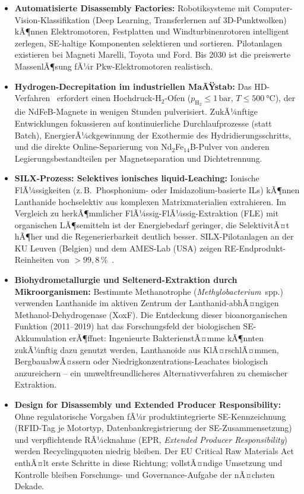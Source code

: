 ﻿\documentclass[12pt, a4paper]{report}
\theoremstyle{definition}
\theoremstyle{remark}
\begin{document}
\begin{itemize}
  \item \textbf{Automatisierte Disassembly Factories:}
    Robotiksysteme mit Computer-Vision-Klas\-sifikation (Deep Learning,
    Transferlernen auf 3D-Punktwolken) kÃ¶nnen Elektromotoren, Festplatten
    und Windturbinenrotoren intelligent zerlegen, SE-haltige Komponenten
    selektieren und sortieren. Pilotanlagen existieren bei
    Magneti Marelli, Toyota und Ford. Bis 2030 ist die preiswerte MassenlÃ¶sung
    fÃ¼r Pkw-Elektromotoren realistisch.

  \item \textbf{Hydrogen-Decrepitation im industriellen MaÃŸstab:}
    Das HD-Verfahren~\cite{zakotnik2009} erfordert einen Hochdruck-$\text{H}_2$-Ofen
    ($p_{\mathrm{H_2}} \leq 1\,\text{bar}$, $T \leq \SI{500}{\celsius}$), der die
    NdFeB-Magnete in wenigen Stunden pulverisiert. ZukÃ¼nftige Entwicklungen
    fokussieren auf kontinuierliche Durchlaufprozesse (statt Batch),
    EnergierÃ¼ckgewinnung der Exothermie des Hydridierungsschritts, und
    die direkte Online-Separierung von Nd$_2$Fe$_{14}$B-Pulver von anderen
    Legierungsbestandteilen per Magnetseparation und Dichtetrennung.

  \item \textbf{SILX-Prozess: Selektives ionisches liquid-Leaching:}
    Ionische FlÃ¼ssigkeiten (z.\,B.\ Phosphonium- oder Imidazolium-basierte
    ILs) kÃ¶nnen Lan\-thanide hochselektiv aus komplexen Matrixmaterialien
    extrahieren. Im Vergleich zu herkÃ¶mmlicher FlÃ¼ssig-FlÃ¼ssig-Extraktion
    (FLE) mit organischen LÃ¶semitteln ist der Energiebedarf geringer, die
    SelektivitÃ¤t hÃ¶her und die Regenerierbarkeit deutlich besser.
    SILX-Pilotanlagen an der KU Leuven (Belgien) und dem AMES-Lab (USA)
    zeigen RE-Endprodukt-Reinheiten von $>99{,}8\,\%$~\cite{binnemans2013}.

  \item \textbf{Biohydrometallurgie und Seltenerd-Extraktion durch Mikroorganismen:}
    Bestimmte Methanotrophe (\emph{Methylobacterium}~spp.) verwenden
    Lanthanide im aktiven Zentrum der Lanthanid-abhÃ¤ngigen
    Methanol-Dehydrogenase (XoxF). Die Entdeckung dieser bioanorganischen
    Funktion (2011--2019) hat das Forschungsfeld der biologischen
    SE-Akkumulation erÃ¶ffnet: Ingenieurte BakterienstÃ¤mme kÃ¶nnten zukÃ¼nftig
    dazu genutzt werden, Lanthanoide aus KlÃ¤rschlÃ¤mmen, BergbauabwÃ¤ssern
    oder Niedrigkonzentrations-Leachates biologisch anzureichern --
    ein umweltfreundlicheres Alternativverfahren zu chemischer Extraktion.

  \item \textbf{Design for Disassembly und Extended Producer Responsibility:}
    Ohne regulatorische Vorgaben fÃ¼r produktintegrierte SE-Kennzeichnung
    (RFID-Tag je Motortyp, Datenbankregistrierung der SE-Zusammensetzung)
    und verpflichtende RÃ¼cknahme (EPR, \emph{Extended Producer Responsibility})
    werden Recyclingquoten niedrig bleiben. Der EU Critical Raw Materials
    Act~\cite{eu2023} enthÃ¤lt erste Schritte in diese Richtung; vollstÃ¤ndige
    Umsetzung und Kontrolle bleiben Forschungs- und Governance-Aufgabe
    der nÃ¤chsten Dekade.
\end{itemize}
\end{document}
